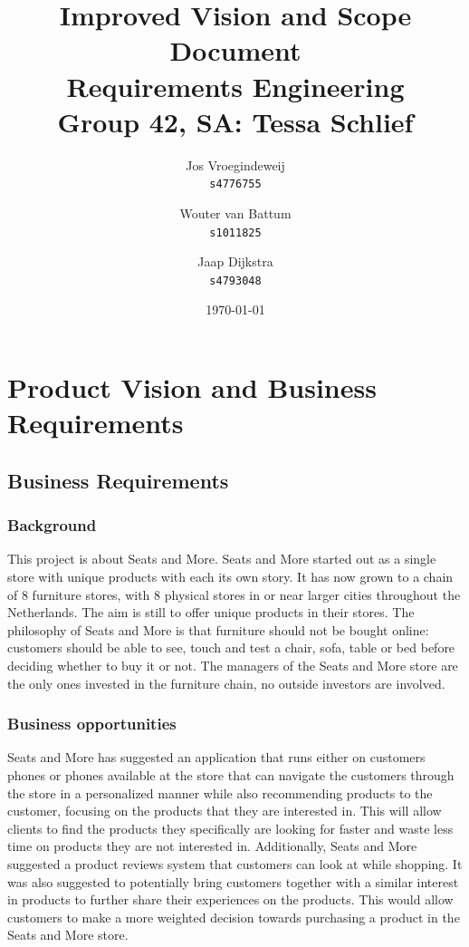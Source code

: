 \documentclass[a4paper]{article}
\title{\textbf{Improved Vision and Scope Document}\\\large Requirements Engineering\\Group 42, SA: Tessa Schlief}
\author{Jos Vroegindeweij\\\texttt{s4776755} \and Wouter van Battum\\\texttt{s1011825}
\and Jaap Dijkstra\\\texttt{s4793048}}
\date{\today}
\begin{document}
\maketitle
\color{black}
\section{Product Vision and Business Requirements}
\subsection*{Business Requirements}
\subsubsection*{Background}
This project is about Seats and More. \color{blue}Seats and More started out as a single store with unique products with each its own story. It has now grown to a chain of 8 furniture stores, \color{black}with 8 physical stores in or near larger cities throughout the Netherlands. \color{blue} The aim is still to offer unique products in their stores. \color{black} The philosophy of Seats and More is that furniture should not be bought online: customers should be able to see, touch and test a chair, sofa, table or bed before deciding whether to buy it or not. \color{blue} The managers of the Seats and More store are the only ones invested in the furniture chain, no outside investors are involved. \color{black}

\subsubsection*{Business opportunities}
Seats and More has suggested an application that runs either on customers phones or phones available at the store that can navigate the customers through the store in a personalized manner while also recommending products to the customer, focusing on the products that they are interested in. This will allow clients to ﬁnd the products they speciﬁcally are looking for faster and waste less time on products they are not interested in. Additionally, Seats and More suggested a product reviews system that customers can look at while shopping. It was also suggested to potentially bring customers together with a similar interest in products to further share their experiences on the products. This would allow customers to make a more weighted decision towards purchasing a product in the Seats and More store.
\end{document}

